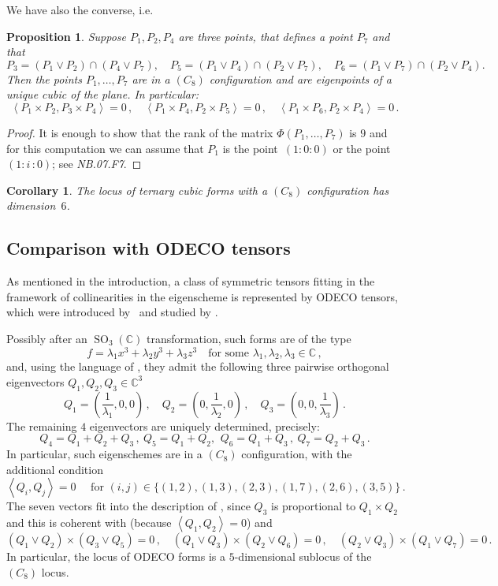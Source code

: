 \documentclass[a4paper, 11pt, reqno]{amsart}
\theoremstyle{plain}
\newtheorem{prop}[lemma]{Proposition}
\newtheorem{corollary}[lemma]{Corollary}
\theoremstyle{definition}
\newcommand{\C}{\mathbb{C}}
\newcommand{\nb}[2]{\textsl{{NB}.{#1}.{#2}}}
\newcommand{\iii}{\textit{i}\,}
\newcommand{\SO}{\operatorname{SO}}
\newcommand{\scl}[2]{\left\langle {#1}, {#2} \right\rangle}
\begin{document}
We have also the converse, i.e.\
\begin{prop}
Suppose $P_1, P_2, P_4$ are three points, that  defines a point $P_7$ and that
%
\[
P_3 = (P_1 \vee P_2) \cap(P_4 \vee P_7), \quad 
P_5 = (P_1 \vee P_4) \cap (P_2 \vee P_7), \quad
P_6 = (P_1 \vee P_7) \cap (P_2 \vee P_4).
\]
%
Then the points $P_1, \dotsc, P_7$ are in a $(C_8)$ configuration
and are eigenpoints of a unique cubic 
of the plane. In particular:
\[
  \scl{P_1 \times P_2}{P_3 \times P_4} = 0 \,, \quad 
  \scl{P_1 \times P_4}{P_2 \times P_5} = 0 \,, \quad 
  \scl{P_1 \times P_6}{P_2 \times P_4} = 0 \,.
\]
\end{prop}
\begin{proof}
It is enough to show that the rank of the matrix $\Phi(P_1, \dots, P_7)$
is $9$ and for this computation we can assume that 
$P_1$ is the point~$(1: 0: 0)$ or the point~$(1: \iii: 0)$;
see \nb{07}{F7}.
\end{proof}

\begin{corollary}
The locus of ternary cubic forms with a $(C_8)$ configuration has dimension~$6$.
\end{corollary}


\subsection*{Comparison with ODECO tensors}
As mentioned in the introduction, a class of
symmetric tensors fitting in the framework of collinearities in the eigenscheme is represented by ODECO tensors, which were introduced by~\cite{Rob} and studied by \cite{BDHE, Koiran2021, Biaggi2022}.

Possibly after an $\SO_3(\C)$ transformation, such forms are of the type
%
\[
  f = \lambda_1 x^3 +\lambda_2 y^3 + \lambda_3 z^3
  \quad \text{for some } \lambda_1, \lambda_2, \lambda_3 \in \C \,,
\]
%
and, using the language of \cite{Rob}, they admit the following three pairwise orthogonal eigenvectors $Q_1, Q_2, Q_3 \in \C^3$
%
\[
  Q_1 = \left( \frac{1}{\lambda_1},0,0 \right) \,, \quad
  Q_2 = \left( 0,\frac{1}{\lambda_2},0 \right) \,, \quad
  Q_3 = \left( 0,0,\frac{1}{\lambda_3} \right) \,.
\]
%
The remaining $4$ eigenvectors are uniquely determined, precisely:
%
\[
  Q_4 = Q_1+Q_2+Q_3\,, \ Q_5 = Q_1+Q_2,\, \ Q_6 = Q_1+Q_3 \,, \ Q_7 = Q_2+Q_3\,.
\]
%
In particular, such eigenschemes are in a $(C_8)$ configuration, with the additional condition
%
\[
  \left\langle Q_i,Q_j \right\rangle = 0
  \quad \text{ for } (i, j) \in \{(1, 2), (1, 3), (2, 3), (1, 7), (2, 6), (3, 5)\} \,.
\]
%
The seven vectors fit into the description of , since $Q_3 $ is proportional to $Q_1 \times Q_2$ and this is coherent with 
(because $\scl{Q_1}{Q_2} = 0$)
and
%
\[
  (Q_1 \vee Q_2) \times (Q_3 \vee Q_5) = 0 \,, \quad
  (Q_1 \vee Q_3) \times (Q_2 \vee Q_6) = 0 \,, \quad
  (Q_2 \vee Q_3) \times (Q_1 \vee Q_7) = 0 \,.
\]
%
In particular, the locus of ODECO forms is a $5$-dimensional sublocus of the $(C_8)$ locus.
\end{document}
